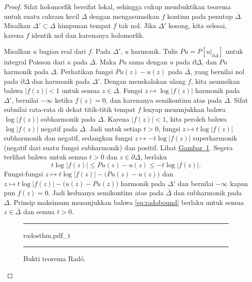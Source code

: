 \documentclass[12pt,openany]{book}
\newcommand{\sabs}[1]{\lvert {#1} \rvert}
\newcommand{\abs}[1]{\left\lvert {#1} \right\rvert}
\theoremstyle{plain}
\theoremstyle{remark}
\theoremstyle{definition}
\newenvironment{myfig}{%
\begin{figure}[h!t]
\noindent\rule{\textwidth}{0.5pt}\vspace{12pt}\par\centering}%
{\par\noindent\rule{\textwidth}{0.5pt}
\end{figure}}
\theoremstyle{exercise}
\theoremstyle{example}
\newcommand{\figureref}[1]{\hyperref[#1]{Gambar~\ref*{#1}}}
\begin{document}
\begin{proof}
Sifat holomorfik bersifat lokal, sehingga
cukup membuktikan teorema untuk suatu cakram kecil $\Delta$
dengan mengasumsikan $f$ kontinu
pada penutup $\overline{\Delta}$.  Misalkan $\Delta' \subset \Delta$ himpunan
tempat $f$ tak nol.  Jika $\Delta'$ kosong, kita selesai, karena
$f$ identik nol dan karenanya holomorfik.

Misalkan $u$ bagian real dari $f$.  Pada $\Delta'$, $u$ harmonik.
Tulis $Pu = P[u|_{\partial \Delta}]$ untuk integral Poisson dari $u$ pada
$\overline{\Delta}$.  Maka $Pu$
sama dengan $u$ pada $\partial \Delta$, dan $Pu$ harmonik pada $\Delta$.
Perhatikan fungsi
$Pu(z) - u(z)$ pada $\overline{\Delta}$, yang bernilai nol
pada $\partial \Delta$ dan harmonik pada $\Delta'$.  Dengan menskalakan ulang $f$,
kita asumsikan bahwa $\abs{f(z)} < 1$ untuk semua $z
\in \overline{\Delta}$. 
Fungsi $z \mapsto \log \sabs{f(z)}$ harmonik pada $\Delta'$, bernilai
$-\infty$ ketika $f(z) = 0$, dan karenanya semikontinu atas pada
$\overline{\Delta}$.
Sifat subnilai rata-rata di dekat titik-titik tempat $f$ lenyap
menunjukkan bahwa
$\log \sabs{f(z)}$ subharmonik pada $\Delta$.
Karena $\sabs{f(z)} < 1$, kita peroleh bahwa
$\log \sabs{f(z)}$ negatif pada $\overline{\Delta}$.
Jadi untuk setiap $t > 0$,
fungsi
$z \mapsto t \log \abs{f(z)}$ subharmonik dan negatif,
sedangkan fungsi
$z \mapsto -t \log \abs{f(z)}$ superharmonik
(negatif dari suatu fungsi subharmonik) dan positif.
Lihat \figureref{fig:radosthm}.
Segera terlihat bahwa untuk semua $t > 0$ dan
$z \in \partial \Delta$,
berlaku
\begin{equation} \label{eq:radobound}
t \log \abs{f(z)} \leq Pu(z)-u(z) \leq -t \log \abs{f(z)}  .
\end{equation}
Fungsi-fungsi
$z \mapsto t \log \abs{f(z)} - \bigl(Pu(z)-u(z)\bigr)$
dan
$z \mapsto t \log \abs{f(z)} - \bigl(u(z)-Pu(z)\bigr)$
harmonik pada $\Delta'$ dan bernilai $-\infty$ kapan pun $f(z)=0$.
Jadi keduanya semikontinu atas pada $\overline{\Delta}$
dan subharmonik pada $\Delta$.
Prinsip maksimum menunjukkan bahwa
\eqref{eq:radobound} berlaku
untuk semua $z \in \overline{\Delta}$ dan semua $t > 0$.

\begin{myfig}
{radosthm.pdf_t}
\caption{Bukti teorema Rad\'o.\label{fig:radosthm}}
\end{myfig}


\end{proof}
\end{document}
